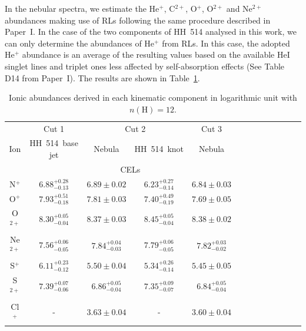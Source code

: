\documentclass[fleqn,usenatbib]{mnras}
\begin{document}

In the nebular spectra, we estimate the He$^{+}$, C$^{2+}$, O$^{+}$, O$^{2+}$ and Ne$^{2+}$ abundances making use of RLs following the same procedure described in Paper~I. In the case of the two components of HH~514 analysed in this work, we can  only determine the abundances of He$^{+}$ from RLs. In this case, the adopted He$^{+}$ abundance is an average of the resulting values based on the available He\thinspace I singlet lines and triplet ones less affected by self-absorption effects (See Table D14 from Paper~I). The results are shown in Table~\ref{tab:ionic_abundances}. 

\begin{table}
\centering
\caption{Ionic abundances derived in each kinematic component in logarithmic unit with $n(\text{H})=12$.}
\label{tab:ionic_abundances}
\begin{tabular}{ccccccccccccc}
\hline
 & \multicolumn{1}{c}{Cut 1} & \multicolumn{2}{c}{Cut 2} & \multicolumn{1}{c}{Cut 3} & \\
Ion &  HH~514~base jet & Nebula & HH~514~knot  & Nebula \\
\hline
 & \multicolumn{4}{c}{CELs}\\

N$^{+}$  & $6.88^{+0.28} _{-0.13}$ &$6.89 \pm 0.02 $  & $6.23^{+0.27} _{-0.14}$& $6.84 \pm 0.03 $\\

O$^{+}$ & $7.93^{+0.51} _{-0.18}$ & $7.81 \pm 0.03 $&$7.40^{+0.49} _{-0.19}$ & $7.69 \pm 0.05 $\\ 

O$^{2+}$ & $8.30^{+0.05} _{-0.04}$& $8.37 \pm 0.03$& $8.45^{+0.05} _{-0.04}$ &$8.38 \pm 0.02 $\\

Ne$^{2+}$ & $7.56^{+0.06} _{-0.05}$& $7.84^{+0.04} _{-0.03}$ & $7.79^{+0.06} _{-0.05}$&$7.82^{+0.03} _{-0.02}$\\

S$^{+}$ & $6.11^{+0.23} _{-0.12}$ & $5.50 \pm 0.04 $& $5.34^{+0.26} _{-0.14}$&$5.45 \pm 0.05 $\\

S$^{2+}$ & $7.39^{+0.07} _{-0.06}$ &$6.86^{+0.05} _{-0.04}$ & $7.35^{+0.09} _{-0.07}$&$6.84^{+0.05} _{-0.04}$\\

Cl$^{+}$ & - &$3.63 \pm 0.04 $&- &$3.60 \pm 0.04 $\\


\end{tabular}
\end{table}
\end{document}

